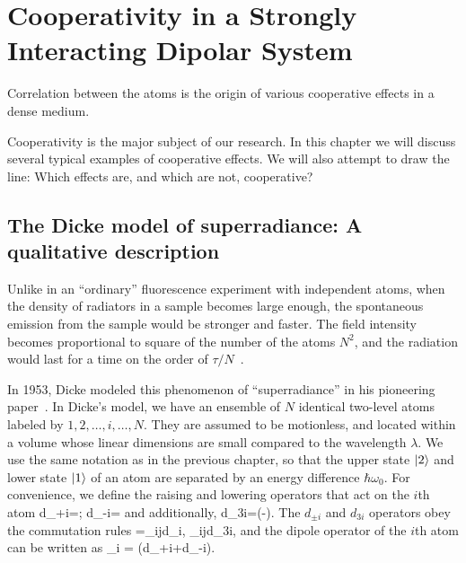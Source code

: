 \chapter{Cooperativity in a Strongly Interacting Dipolar System}

Correlation between the atoms is the origin of various cooperative effects in a dense medium. 

Cooperativity is the major subject of our research. In this chapter we will discuss several typical examples of cooperative effects. We will also attempt to draw the line: Which effects are, and which are not, cooperative?

\section{The Dicke model of superradiance: A qualitative description}
\label{DICKESTORY}
Unlike in an ``ordinary'' fluorescence experiment with independent atoms, when the density of radiators in a sample becomes large enough, the spontaneous emission from the sample would be stronger and faster.  The field intensity becomes proportional to square of the number of the atoms $N^2$, and the radiation would last for a time on the order of $\tau/N$~\cite{0038-5670-23-8-R04,1982PhR....93..301G}. 

In 1953, Dicke modeled this phenomenon of ``superradiance''  in his pioneering paper~\cite{Dicke_superradiance}. In Dicke's model, we have an ensemble of $N$ identical two-level atoms labeled by $1,2,\dots,i,\dots,N$. They are assumed to be motionless, and located within a volume  whose linear dimensions are small compared to the wavelength $\lambda$. We use the same notation as in the previous chapter, so that the upper state $\left| 2 \right\rangle$ and lower state $\left| 1 \right\rangle$ of an atom are separated by an energy difference $\hbar\omega_0$. For convenience, we define the raising and lowering operators that act on the $i$th atom
\bea
d_{+i}=; \quad d_{-i}=
\eea  
and additionally,
\bea
d_{3i}=\left(-\right).
\eea
The $d_{\pm i}$ and $d_{3i}$ operators obey the commutation rules
\bea
[d_{3i},d_{\pm i}]=\pm\delta_{ij}d_{\pm i}, \delta_{ij}d_{3i},
\eea
and the dipole operator of the $i$th atom can be written as
\bea
\bd_i = \left(d_{+i}+d_{-i}\right)\dip{}.
\eea 

